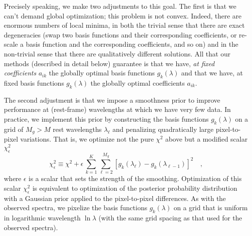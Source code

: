 \documentclass[12pt]{article}
\begin{document}
Precisely speaking, we make two adjustments to this goal.  The first
is that we can't demand global optimization; this problem is not
convex.  Indeed, there are enormous numbers of local minima, in both
the trivial sense that there are exact degeneracies (swap two basis
functions and their corresponding coefficients, or re-scale a basis
function and the corresponding coefficients, and so on) and in the
non-trivial sense that there are qualitatively different solutions.
All that our methods (described in detail below) guarantee is that we
have, \emph{at fixed coefficients $a_{ik}$} the globally optimal basis
functions $g_k(\lambda)$ and that we have, at fixed basis functions
$g_k(\lambda)$ the globally optimal coefficients $a_{ik}$.

The second adjustment is that we impose a smoothness prior to improve
performance at (rest-frame) wavelengths at which we have very few
data.  In practice, we implement this prior by constructing the basis
functions $g_k(\lambda)$ on a grid of $M_g>M$ rest wavelengths
$\lambda_{\ell}$ and penalizing quadratically large pixel-to-pixel
variations.  That is, we optimize not the pure $\chi^2$ above but a
modified scalar $\chi_{\epsilon}^2$
\begin{equation}
\chi_{\epsilon}^2 \equiv \chi^2
 + \epsilon\,\sum_{k=1}^K \sum_{\ell=2}^{M_g}
 \left[g_k(\lambda_{\ell})-g_k(\lambda_{\ell-1})\right]^2
\quad ,
\end{equation}
where $\epsilon$ is a scalar that sets the strength of the smoothing.
Optimization of this scalar $\chi_{\epsilon}^2$ is equivalent to
optimization of the posterior probability distribution with a Gaussian
prior applied to the pixel-to-pixel differences.  As with the observed
spectra, we pixelize the basis functions $g_k(\lambda)$ on a grid that
is uniform in logarithmic wavelength $\ln\lambda$ (with the same grid
spacing as that used for the observed spectra).
\end{document}
